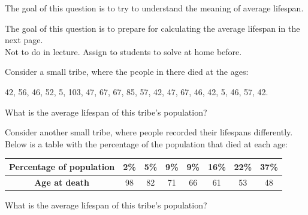 \question The goal of this question is to try to understand the meaning of average lifespan.
\begin{annotation}
\begin{goals}
	The goal of this question is to prepare for calculating the average lifespan in the next page. \\

	Not to do in lecture. Assign to students to solve at home before.
\end{goals}
\end{annotation}
\begin{parts}
	\item Consider a small tribe, where the people in there died at the ages:		
		\begin{graybox}
		\begin{center}
			42, 56, 46, 52, 5, 103, 47, 67, 67, 85, 57, 42, 47, 67, 46, 42, 5, 46, 57, 42.
		\end{center}
		\end{graybox}
		What is the average lifespan of this tribe's population? %

	\item  Consider another small tribe, where people recorded their lifespans differently. Below is a table with the percentage of the population that died at each age:
		\begin{graybox}
		\begin{center}
		\begin{tabular}{c||c|c|c|c|c|c|c}
			\textbf{Percentage of population}
				& 2\% & 5\% & 9\% & 9\% & 16\% & 22\% & 37\% \\ \hline
			\textbf{Age at death}
				& 98 & 82 & 71 & 66 & 61 & 53 & 48\\
		\end{tabular}
		\end{center}
		\end{graybox}
		What is the average lifespan of this tribe's population? %
\end{parts}
 

\vfill



\bookonlynewpage



